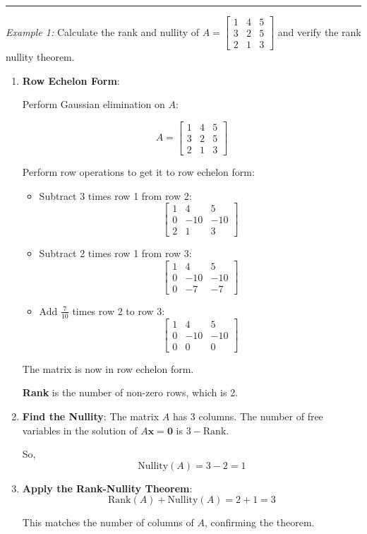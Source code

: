 \documentclass[
  letterpaper,
  DIV=11,
  numbers=noendperiod]{scrreprt}
\theoremstyle{plain}
\theoremstyle{definition}
\theoremstyle{remark}
\begin{document}
\begin{center}\rule{0.5\linewidth}{0.5pt}\end{center}

\emph{Example 1:} Calculate the rank and nullity of \(A=\begin{bmatrix}
   1 & 4 & 5 \\
   3 & 2 & 5 \\
   2 & 1 & 3
   \end{bmatrix}\) and verify the rank nullity theorem.

\begin{enumerate}
\def\labelenumi{\arabic{enumi}.}
\item
  \textbf{Row Echelon Form}:

  Perform Gaussian elimination on \(A\):

  \[A = \begin{bmatrix}
  1 & 4 & 5 \\
  3 & 2 & 5 \\
  2 & 1 & 3
  \end{bmatrix}\]

  Perform row operations to get it to row echelon form:

  \begin{itemize}
  \item
    Subtract 3 times row 1 from row 2: \[\begin{bmatrix}
    1 & 4 & 5 \\
    0 & -10 & -10 \\
    2 & 1 & 3
    \end{bmatrix}\]
  \item
    Subtract 2 times row 1 from row 3: \[\begin{bmatrix}
    1 & 4 & 5 \\
    0 & -10 & -10 \\
    0 & -7 & -7
    \end{bmatrix}\]
  \item
    Add \(\frac{7}{10}\) times row 2 to row 3: \[\begin{bmatrix}
    1 & 4 & 5 \\
    0 & -10 & -10 \\
    0 & 0 & 0
    \end{bmatrix}\]
  \end{itemize}

  The matrix is now in row echelon form.

  \textbf{Rank} is the number of non-zero rows, which is 2.
\item
  \textbf{Find the Nullity}: The matrix \(A\) has 3 columns. The number
  of free variables in the solution of \(A \mathbf{x} = \mathbf{0}\) is
  \(3 - \text{Rank}\).

  So, \[\text{Nullity}(A) = 3 - 2 = 1\]
\item
  \textbf{Apply the Rank-Nullity Theorem}:
  \[\text{Rank}(A) + \text{Nullity}(A) = 2 + 1 = 3\]

  This matches the number of columns of \(A\), confirming the theorem.
\end{enumerate}
\end{document}
